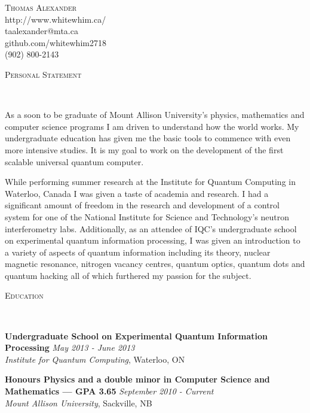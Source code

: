 \documentclass[9pt]{article}
\newenvironment{changemargin}[2]{%
  \begin{list}{}{%
    \setlength{\topsep}{0pt}%
    \setlength{\leftmargin}{#1}%
    \setlength{\rightmargin}{#2}%
    \setlength{\listparindent}{\parindent}%
    \setlength{\itemindent}{\parindent}%
    \setlength{\parsep}{\parskip}%
  }%
  \item[]}{\end{list}
}
\newcommand{\lineover}{
	\begin{changemargin}{-0.05in}{-0.05in}
		\vspace*{-8pt}
		\hrulefill \\
		\vspace*{-2pt}
	\end{changemargin}
}
\newcommand{\header}[1]{
	\begin{changemargin}{-0.5in}{-0.5in}
		\scshape{#1}\\
  	\lineover
	\end{changemargin}
}
\newcommand{\contact}[5]{
	\begin{changemargin}{-0.5in}{-0.5in}
		\begin{center}
			{\Large \scshape {#1}}\\ \smallskip
			{#2}\\ \smallskip 
			{#3}\\ \smallskip
			{#5}\\ \smallskip
			{#4}\smallskip
		\end{center}
	\end{changemargin}
}
\newenvironment{body} {
	\vspace*{-16pt}
	\begin{changemargin}{-0.25in}{-0.5in}
  }	
	{\end{changemargin}
}
\begin{document}
\contact{Thomas Alexander}{http://www.whitewhim.ca/}{taalexander@mta.ca}{(902) 800-2143}{github.com/whitewhim2718}


\header{Personal Statement}

\begin{body}
	\vspace{14pt}
	As a soon to be graduate of Mount Allison University's physics, mathematics and computer science programs I am driven to understand how the world works. My undergraduate education has given me the basic tools to commence with even more intensive studies. It is my goal to work on the development of the first scalable universal quantum computer.
	 
	While performing summer research at the Institute for Quantum Computing in Waterloo, Canada I was given a taste of academia and research. I had a significant amount of freedom in the research and development of a control system for one of the National Institute for Science and Technology's neutron interferometry labs. Additionally, as an attendee of IQC's undergraduate school on experimental quantum information processing, I was given an introduction to a variety of aspects of quantum information including its theory, nuclear magnetic resonance, nitrogen vacancy centres, quantum optics, quantum dots and quantum hacking all of which furthered my passion for the subject. 
	
\end{body}

\smallskip


\header{Education}
\begin{body}
	\vspace{14pt}
	\textbf{Undergraduate School on Experimental Quantum Information Processing}{} \hfill \emph{May 2013 - June 2013}{} \\
	\emph{Institute for Quantum Computing}, Waterloo, ON{} \\
  
\end{body}
\begin{body}
	\vspace{14pt}
	\textbf{Honours Physics and a double minor in Computer Science and Mathematics --- GPA 3.65 }{} \hfill \emph{September 2010 - Current}{} \\
	\emph{Mount Allison University}, Sackville, NB{} \\
  
\end{body}
\end{document}
